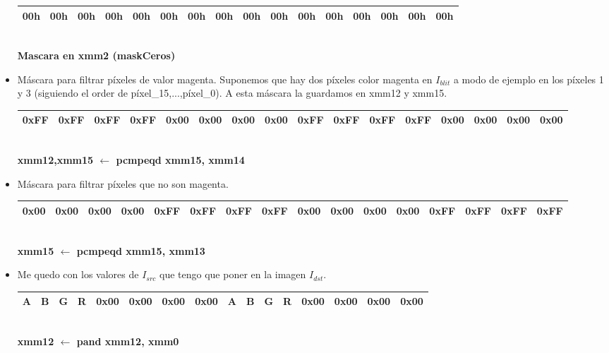 \begin{itemize}
		\begin{center}
		   \begin{tabular}{| c | c | c | c || c | c | c | c || c | c | c | c || c | c | c | c |}
			 \hline
			 00h & 00h & 00h & 00h & 00h & 00h & 00h & 00h & 00h & 00h & 00h & 00h & 00h & 00h & 00h & 00h \\ \hline
		   \end{tabular}
		   \\ \textbf{Mascara en xmm2 (maskCeros)}
		\end{center}
		
	\item Máscara para filtrar píxeles de valor magenta. Suponemos que hay dos píxeles color magenta en $I_{blit}$ a modo de ejemplo en los píxeles 1 y 3 (siguiendo el order de píxel_15,...,píxel_0). A esta máscara la guardamos en xmm12 y xmm15.
	
		\begin{center}
		   \begin{tabular}{| c | c | c | c || c | c | c | c || c | c | c | c || c | c | c | c |}
			 \hline
			 0xFF & 0xFF & 0xFF & 0xFF & 0x00 & 0x00 & 0x00 & 0x00 & 0xFF & 0xFF & 0xFF & 0xFF & 0x00 & 0x00 & 0x00 & 0x00 \\ \hline
		   \end{tabular}
		   \\ \textbf{xmm12,xmm15 $\gets$ pcmpeqd xmm15, xmm14}
		\end{center}

	\item Máscara para filtrar píxeles que no son magenta.

		\begin{center}
		   \begin{tabular}{| c | c | c | c || c | c | c | c || c | c | c | c || c | c | c | c |}
			 \hline
			 0x00 & 0x00 & 0x00 & 0x00 & 0xFF & 0xFF & 0xFF & 0xFF & 0x00 & 0x00 & 0x00 & 0x00 & 0xFF & 0xFF & 0xFF & 0xFF \\ \hline
		   \end{tabular}
		   \\ \textbf{xmm15 $\gets$ pcmpeqd xmm15, xmm13}
		\end{center}

	\item  Me quedo con los valores de $I_{src}$ que tengo que poner en la imagen $I_{dst}$.
		\begin{center}
		   \begin{tabular}{| c | c | c | c || c | c | c | c || c | c | c | c || c | c | c | c |}
			 \hline
			 A & B & G & R & 0x00 & 0x00 & 0x00 & 0x00 & A & B & G & R & 0x00 & 0x00 & 0x00 & 0x00 \\ \hline
		   \end{tabular}
		   \\ \textbf{xmm12 $\gets$ pand xmm12, xmm0}
		\end{center}		


\end{itemize}
